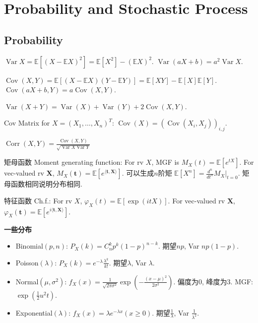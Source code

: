 \documentclass[UTF8]{ctexart}
\begin{document}
\section{Probability and Stochastic Process}

\subsection{Probability}

$\operatorname{Var}X = \mathbb{E}[(X-\mathbb{E}X)^2] = \mathbb{E}[X^2]-(\mathbb{E}X)^2$.
$\operatorname{Var}(aX+b) = a^2 \operatorname{Var}X$.

$\operatorname{Cov}(X,Y) = \mathbb{E}[(X-\mathbb{E}X)(Y-\mathbb{E}Y)]
	= \mathbb{E}[XY]-\mathbb{E}[X]\mathbb{E}[Y]$.
$\operatorname{Cov}(aX+b,Y) = a\operatorname{Cov}(X,Y)$.

$\operatorname{Var}(X+Y)=\operatorname{Var}(X)+\operatorname{Var}(Y)+2\operatorname{Cov}(X,Y)$.

Cov Matrix for $X=(X_1,\dots,X_n)^T$: $\operatorname{Cov}(X) = (\operatorname{Cov}(X_i,X_j))_{i,j}$.

$\operatorname{Corr}(X,Y)=\frac{\operatorname{Cov}(X,Y)}{\sqrt{\operatorname{Var}X \operatorname{Var}Y}}$

矩母函数 Moment generating function: For rv $X$, MGF is $M_X(t)=\mathbb{E}[e^{tX}]$.
For vec-valued rv $\mathbf{X}$, $M_X(\mathbf{t})=\mathbb{E}[e^{\langle \mathbf{t},\mathbf{X} \rangle }]$.
可以生成$n$阶矩 $\mathbb{E}[X^n]=\frac{d^n}{dt^n}M_X \Big| _{t=0}$. 矩母函数相同说明分布相同.


特征函数 Ch.f.: For rv $X$, $\varphi_X(t)=\mathbb{E} [\exp(itX)]$.
For vec-valued rv $\mathbf{X}$, $\varphi_X(\mathbf{t})=\mathbb{E}[e^{i \langle \mathbf{t},\mathbf{X} \rangle }]$.

\noindent \textbf{一些分布}
\begin{itemize}

	\item Binomial$(p, n)$: $P_X(k)=C_n^k p^k (1-p)^{n-k}$. 期望$np$, Var $np(1-p)$.
	\item Poisson$(\lambda)$: $P_X(k)=e^{-\lambda}\frac{\lambda^k}{k!}$. 期望$\lambda$, Var $\lambda$.
	\item Normal$(\mu, \sigma^2)$: $f_X(x)=\frac{1}{\sqrt{2\pi\sigma^2}}\exp(-\frac{(x-\mu)^2}{2\sigma^2})$. 偏度为0, 峰度为3. MGF: $\exp (\frac12 u^2 t)$.
	\item Exponential$(\lambda)$: $f_X(x) = \lambda e^{-\lambda x}(x\geq 0)$. 期望$\frac{1}{\lambda}$, Var $\frac{1}{\lambda^2}$.

\end{itemize}
\end{document}
